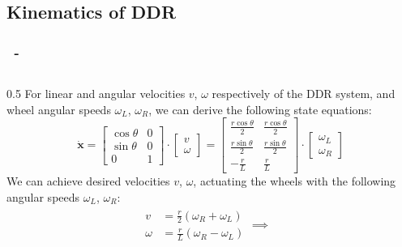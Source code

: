 \documentclass{beamer}
\begin{document}
\subsection{Kinematics of DDR}
\begin{frame}
    \frametitle{\insertsection \ - \insertsubsection}
    \begin{columns}
        \begin{column}{0.5\linewidth}
            \footnotesize
            For linear and angular velocities $v$, $\omega$ respectively of the DDR system, and wheel angular speeds $\omega_{L}$, $\omega_{R}$, we can derive the following state equations:
            \[
                \dot{\mathbf{x}} =
                \begin{bmatrix}
                    \cos\theta & 0 \\
                    \sin\theta & 0 \\
                    0          & 1
                \end{bmatrix} \cdot
                \begin{bmatrix}
                    v \\
                    \omega
                \end{bmatrix} =
                \begin{bmatrix}
                    \frac{r\cos\theta}{2} & \frac{r\cos\theta}{2} \\
                    \frac{r\sin\theta}{2} & \frac{r\sin\theta}{2} \\
                    -\frac{r}{L}          & \frac{r}{L}
                \end{bmatrix} \cdot
                \begin{bmatrix}
                    \omega_L \\
                    \omega_R
                \end{bmatrix}
            \]
            We can achieve desired velocities $v$, $\omega$, actuating the wheels with the following angular speeds $\omega_{L}$, $\omega_{R}$:
            \[
                \begin{aligned}
                    \begin{aligned}
                        v      & = \frac{r}{2}\left(\omega_R + \omega_L\right) \\
                        \omega & = \frac{r}{L}\left(\omega_R - \omega_L\right)
                    \end{aligned} \implies
                    \begin{aligned}

\end{aligned}
\end{aligned}\]
\end{column}
\end{columns}
\end{frame}
\end{document}
